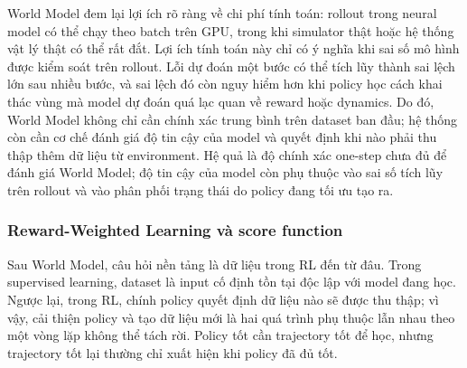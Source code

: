 World Model đem lại lợi ích rõ ràng về chi phí tính toán: rollout trong neural model có thể chạy theo batch trên GPU, trong khi simulator thật hoặc hệ thống vật lý thật có thể rất đắt.
Lợi ích tính toán này chỉ có ý nghĩa khi sai số mô hình được kiểm soát trên rollout.
Lỗi dự đoán một bước có thể tích lũy thành sai lệch lớn sau nhiều bước, và sai lệch đó còn nguy hiểm hơn khi policy học cách khai thác vùng mà model dự đoán quá lạc quan về reward hoặc dynamics.
Do đó, World Model không chỉ cần chính xác trung bình trên dataset ban đầu; hệ thống còn cần cơ chế đánh giá độ tin cậy của model và quyết định khi nào phải thu thập thêm dữ liệu từ environment.
Hệ quả là độ chính xác one-step chưa đủ để đánh giá World Model; độ tin cậy của model còn phụ thuộc vào sai số tích lũy trên rollout và vào phân phối trạng thái do policy đang tối ưu tạo ra.

\subsubsection{Reward-Weighted Learning và score function}

Sau World Model, câu hỏi nền tảng là dữ liệu trong RL đến từ đâu.
Trong supervised learning, dataset là input cố định tồn tại độc lập với model đang học.
Ngược lại, trong RL, chính policy quyết định dữ liệu nào sẽ được thu thập; vì vậy, cải thiện policy và tạo dữ liệu mới là hai quá trình phụ thuộc lẫn nhau theo một vòng lặp không thể tách rời.
Policy tốt cần trajectory tốt để học, nhưng trajectory tốt lại thường chỉ xuất hiện khi policy đã đủ tốt.

